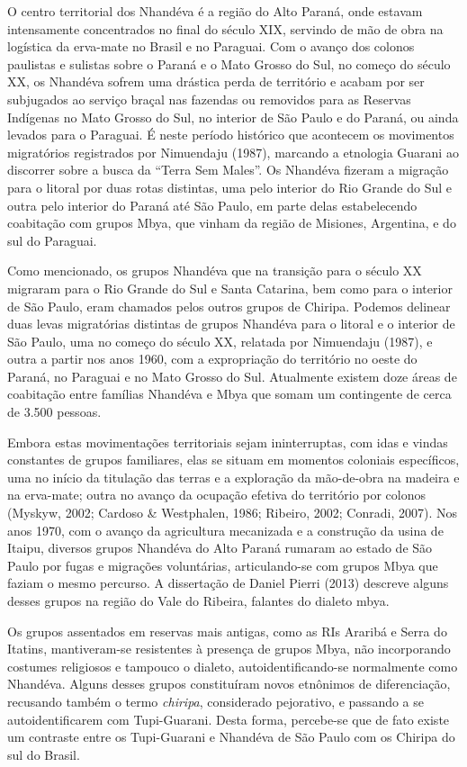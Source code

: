 O centro territorial dos Nhandéva é a região do Alto Paraná, onde
estavam intensamente concentrados no final do século XIX, servindo de
mão de obra na logística da erva-mate no Brasil e no Paraguai. Com o
avanço dos colonos paulistas e sulistas sobre o Paraná e o Mato Grosso
do Sul, no começo do século XX, os Nhandéva sofrem uma drástica perda de
território e acabam por ser subjugados ao serviço braçal nas fazendas ou
removidos para as Reservas Indígenas no Mato Grosso do Sul, no interior
de São Paulo e do Paraná, ou ainda levados para o Paraguai. É neste
período histórico que acontecem os movimentos migratórios registrados
por Nimuendaju (1987), marcando a etnologia Guarani ao discorrer sobre a
busca da ``Terra Sem Males''. Os Nhandéva fizeram a migração para o
litoral por duas rotas distintas, uma pelo interior do Rio Grande do Sul
e outra pelo interior do Paraná até São Paulo, em parte delas
estabelecendo coabitação com grupos Mbya, que vinham da região de
Misiones, Argentina, e do sul do Paraguai.

Como mencionado, os grupos Nhandéva que na transição para o século XX
migraram para o Rio Grande do Sul e Santa Catarina, bem como para o
interior de São Paulo, eram chamados pelos outros grupos de Chiripa.
Podemos delinear duas levas migratórias distintas de grupos Nhandéva
para o litoral e o interior de São Paulo, uma no começo do século XX,
relatada por Nimuendaju (1987), e outra a partir nos anos 1960, com a
expropriação do território no oeste do Paraná, no Paraguai e no Mato
Grosso do Sul. Atualmente existem doze áreas de coabitação entre
famílias Nhandéva e Mbya que somam um contingente de cerca de 3.500
pessoas.

Embora estas movimentações territoriais sejam ininterruptas, com idas e
vindas constantes de grupos familiares, elas se situam em momentos
coloniais específicos, uma no início da titulação das terras e a
exploração da mão-de-obra na madeira e na erva-mate; outra no avanço da
ocupação efetiva do território por colonos (Myskyw, 2002; Cardoso \&
Westphalen, 1986; Ribeiro, 2002; Conradi, 2007). Nos anos 1970, com o
avanço da agricultura mecanizada e a construção da usina de Itaipu,
diversos grupos Nhandéva do Alto Paraná rumaram ao estado de São Paulo
por fugas e migrações voluntárias, articulando-se com grupos Mbya que
faziam o mesmo percurso. A dissertação de Daniel Pierri (2013) descreve
alguns desses grupos na região do Vale do Ribeira, falantes do dialeto
mbya.

Os grupos assentados em reservas mais antigas, como as RIs Araribá e
Serra do Itatins, mantiveram-se resistentes à presença de grupos Mbya,
não incorporando costumes religiosos e tampouco o dialeto,
autoidentificando-se normalmente como Nhandéva. Alguns desses grupos
constituíram novos etnônimos de diferenciação, recusando também o termo
\emph{chiripa}, considerado pejorativo, e passando a se
autoidentificarem com Tupi-Guarani. Desta forma, percebe-se que de fato
existe um contraste entre os Tupi-Guarani e Nhandéva de São Paulo com os
Chiripa do sul do Brasil.

